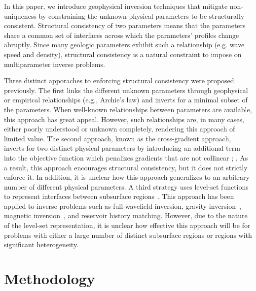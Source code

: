 \documentclass[manuscript,revised]{geophysics}
\begin{document}
In this paper, we introduce geophysical inversion techniques that mitigate non-uniqueness by constraining the unknown physical parameters to be structurally consistent.  Structural consistency of two parameters means that the parameters share a common set of interfaces across which the parameters' profiles  change abruptly.  Since many geologic parameters exhibit such a relationship (e.g. wave speed and density), structural consistency is a natural constraint to impose on multiparameter inverse problems.  

Three distinct apporaches to enforcing structural consistency were proposed previously.  The first links the different unknown parameters through geophysical or empirical relationships (e.g., Archie’s law) and inverts for a minimal subset of the parameters. When well-known relationships between parameters are available, this approach has great appeal. However, such relationships are, in many cases, either poorly understood or unknown completely, rendering this approach of limited value.  The second approach, known as the cross-gradient approach, inverts for two distinct physical parameters by introducing an additional term into the objective function which penalizes gradients that are not collinear \cite{Haber_1997}; \cite{Gallardo_2007}. As a result, this approach encourages structural consistency, but it does not strictly enforce it. In addition, it is unclear how this approach generalizes to an arbitrary number of different physical parameters. 
A third strategy uses level-set functions to represent interfaces between subsurface regions~\cite{Kadu_2016}. This approach has been applied to inverse problems such as full-wavefield inversion, gravity inversion~\cite{Li_2016}, magnetic inversion~\cite{Li_2017}, and reservoir history matching. However, due to the nature of the level-set representation, it is unclear how effective this approach will be for problems with either a large number of distinct subsurface regions or regions with significant heterogeneity. 

\section{Methodology}
\end{document}
